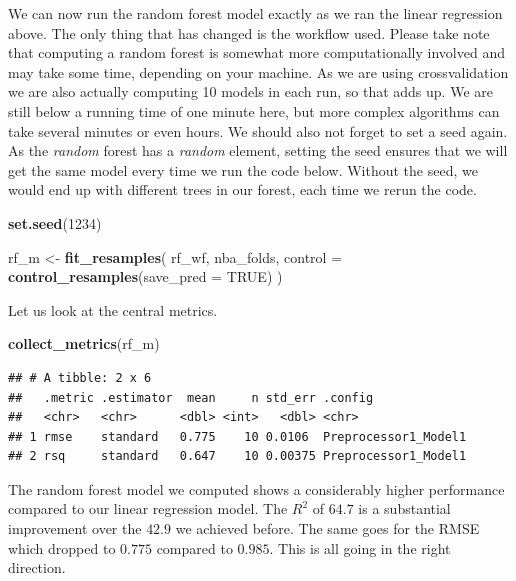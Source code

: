 \documentclass[
]{book}
\newenvironment{Shaded}{\begin{snugshade}}{\end{snugshade}}
\newcommand{\AttributeTok}[1]{\textcolor[rgb]{0.13,0.29,0.53}{#1}}
\newcommand{\ConstantTok}[1]{\textcolor[rgb]{0.56,0.35,0.01}{#1}}
\newcommand{\DecValTok}[1]{\textcolor[rgb]{0.00,0.00,0.81}{#1}}
\newcommand{\FunctionTok}[1]{\textcolor[rgb]{0.13,0.29,0.53}{\textbf{#1}}}
\newcommand{\NormalTok}[1]{#1}
\newcommand{\OtherTok}[1]{\textcolor[rgb]{0.56,0.35,0.01}{#1}}
\begin{document}
We can now run the random forest model exactly as we ran the linear regression
above. The only thing that has changed is the workflow used. Please take note
that computing a random forest is somewhat more computationally involved and may
take some time, depending on your machine.
As we are using crossvalidation we are
also actually computing 10 models in each run, so that adds up. We are still
below a running time of one minute here, but more complex algorithms can take
several minutes or even hours.
We should also not forget to set a seed again. As the \emph{random} forest has a
\emph{random} element, setting the seed ensures that we will get the same model
every time we run the code below. Without the seed, we would end up with
different trees in our forest, each time we rerun the code.

\begin{Shaded}
\begin{Highlighting}[]
\FunctionTok{set.seed}\NormalTok{(}\DecValTok{1234}\NormalTok{)}

\NormalTok{rf\_m }\OtherTok{\textless{}{-}} \FunctionTok{fit\_resamples}\NormalTok{(}
\NormalTok{  rf\_wf,}
\NormalTok{  nba\_folds,}
  \AttributeTok{control =} \FunctionTok{control\_resamples}\NormalTok{(}\AttributeTok{save\_pred =} \ConstantTok{TRUE}\NormalTok{)}
\NormalTok{)}
\end{Highlighting}
\end{Shaded}

Let us look at the central metrics.

\begin{Shaded}
\begin{Highlighting}[]
\FunctionTok{collect\_metrics}\NormalTok{(rf\_m)}
\end{Highlighting}
\end{Shaded}

\begin{verbatim}
## # A tibble: 2 x 6
##   .metric .estimator  mean     n std_err .config             
##   <chr>   <chr>      <dbl> <int>   <dbl> <chr>               
## 1 rmse    standard   0.775    10 0.0106  Preprocessor1_Model1
## 2 rsq     standard   0.647    10 0.00375 Preprocessor1_Model1
\end{verbatim}

The random forest model we computed shows a considerably higher
performance compared to our linear regression model. The \(R^2\) of \(64.7\)
is a substantial improvement over the \(42.9\) we achieved before. The same goes
for the RMSE which dropped to \(0.775\) compared to \(0.985\). This is all going in
the right direction.
\end{document}
